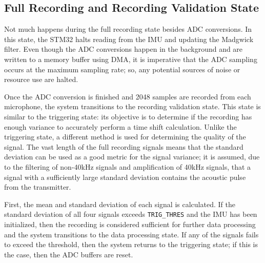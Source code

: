 \documentclass[11pt]{ucthesisCP}
\begin{document}
\subsection{Full Recording and Recording Validation State} \label{ssec:3s7s4}
Not much happens during the full recording state besides ADC conversions. In this state, the STM32 halts reading from the IMU and updating the Madgwick filter. Even though the ADC conversions happen in the background and are written to a memory buffer using DMA, it is imperative that the ADC sampling occurs at the maximum sampling rate; so, any potential sources of noise or resource use are halted.

Once the ADC conversion is finished and 2048 samples are recorded from each microphone, the system transitions to the recording validation state. This state is similar to the triggering state: its objective is to determine if the recording has enough variance to accurately perform a time shift calculation. Unlike the triggering state, a different method is used for determining the quality of the signal. The vast length of the full recording signals means that the standard deviation can be used as a good metric for the signal variance; it is assumed, due to the filtering of non-40kHz signals and amplification of 40kHz signals, that a signal with a sufficiently large standard deviation contains the acoustic pulse from the transmitter.

First, the mean and standard deviation of each signal is calculated. If the standard deviation of all four signals exceeds \verb|TRIG_THRES| and the IMU has been initialized, then the recording is considered sufficient for further data processing and the system transitions to the data processing state. If any of the signals fails to exceed the threshold, then the system returns to the triggering state; if this is the case, then the ADC buffers are reset. 
\end{document}
